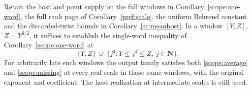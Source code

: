 \begin{corollary}\label{scope:fourth-powers}
Retain the host and point supply on the full windows in
Corollary~\ref{scope:one-word}, the full rank page of
Corollary~\ref{pref:scale}, the uniform Behrend constant and the
discarded-twist bounds in Corollary~\ref{ar:meanhost}. In a window
\([Y,Z]\), \(Z=Y^{3/2}\), it suffices to establish the single-word
inequality of Corollary~\ref{scope:one-word} at
\[
             \{Y,Z\}\ \cup\ \{j^4:Y\le j^4\le Z,\ j\in\mathbf N\}.
\]
For arbitrarily late such windows the output family satisfies both
\eqref{scope:average} and \eqref{scope:missing} at every real scale
in those same windows, with the original exponent and coefficient.
The host realization at intermediate scales is still used.
\end{corollary}
